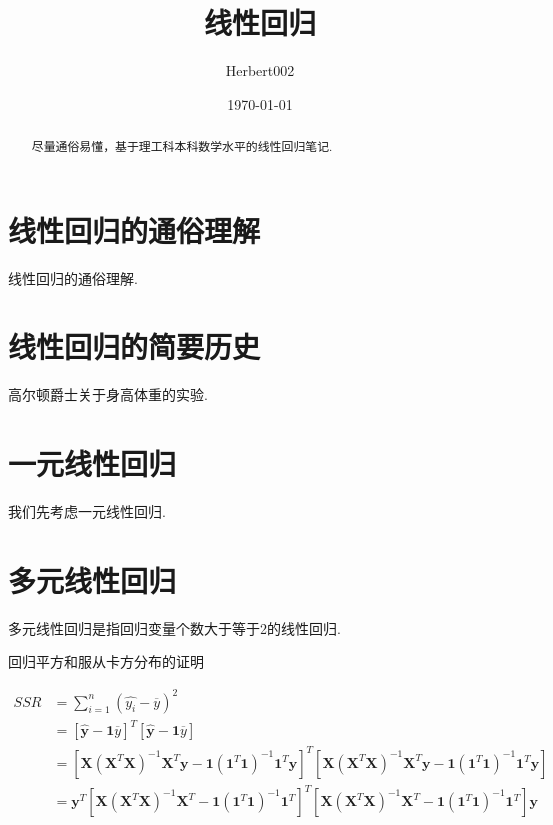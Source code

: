 \documentclass[UTF8]{ctexart}
\title{\heiti 线性回归}
\author{\kaishu Herbert002}
\date{\today}
\begin{document}
	
	\maketitle
	
	\begin{abstract}
		尽量通俗易懂，基于理工科本科数学水平的线性回归笔记.
	\end{abstract}
	
	\tableofcontents
	
	\section{线性回归的通俗理解}
	线性回归的通俗理解.
	
	\section{线性回归的简要历史}
	高尔顿爵士关于身高体重的实验.
	
	\section{一元线性回归}
	我们先考虑一元线性回归.
	
	\section{多元线性回归}
	多元线性回归是指回归变量个数大于等于2的线性回归.
	
	回归平方和服从卡方分布的证明
	
	\begin{equation}
		\begin{aligned}
			SSR & = \sum_{i=1}^{n} {(\hat{y_{i}} - \overline{y})^2} \\
			    & = [\boldsymbol{\hat{y}} - \boldsymbol{1} \overline{y}]^T [\boldsymbol{\hat{y}} - \boldsymbol{1} \overline{y}] \\
			    & = [\boldsymbol{X} (\boldsymbol{X}^T \boldsymbol{X})^{-1} \boldsymbol{X}^T \boldsymbol{y} - \boldsymbol{1}  (\boldsymbol{1}^T \boldsymbol{1})^{-1} \boldsymbol{1}^T \boldsymbol{y}]^T [\boldsymbol{X} (\boldsymbol{X}^T \boldsymbol{X})^{-1} \boldsymbol{X}^T \boldsymbol{y} - \boldsymbol{1}  (\boldsymbol{1}^T \boldsymbol{1})^{-1} \boldsymbol{1}^T \boldsymbol{y}] \\
			    & = \boldsymbol{y}^T [\boldsymbol{X} (\boldsymbol{X}^T \boldsymbol{X})^{-1} \boldsymbol{X}^T - \boldsymbol{1}  (\boldsymbol{1}^T \boldsymbol{1})^{-1} \boldsymbol{1}^T ]^T [\boldsymbol{X} (\boldsymbol{X}^T \boldsymbol{X})^{-1} \boldsymbol{X}^T - \boldsymbol{1}  (\boldsymbol{1}^T \boldsymbol{1})^{-1} \boldsymbol{1}^T] \boldsymbol{y} \\
		\end{aligned}
	\end{equation}
\end{document}
